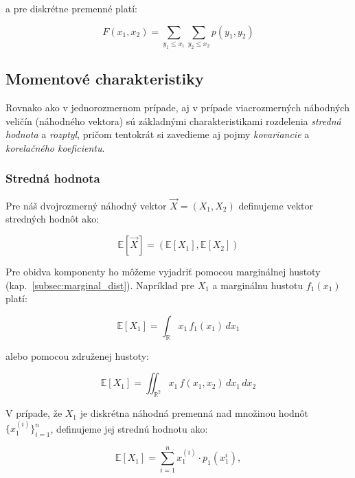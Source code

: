 a pre diskrétne premenné platí:

\begin{equation}
    F(x_1,x_2) = \sum_{y_1\leq x_1}\sum_{y_2\leq x_2} p(y_1,y_2)
\end{equation}

\subsection{Momentové charakteristiky}\label{joint_moments}

Rovnako ako v jednorozmernom prípade, aj v prípade viacrozmerných náhodných veličín (náhodného vektora) sú základnými charakteristikami rozdelenia \textit{stredná hodnota} a \textit{rozptyl}, pričom tentokrát si zavedieme aj pojmy \textit{kovariancie} a \textit{korelačného koeficientu}.

\subsubsection{Stredná hodnota}\label{subsubsec:joint_mean}

Pre náš dvojrozmerný náhodný vektor \(\vec{X} = (X_1, X_2)\) definujeme vektor stredných hodnôt ako:

\begin{equation}
\mathbb{E}[\vec{X}] = \left( \mathbb{E}[X_1], \mathbb{E}[X_2] \right)
\end{equation}

Pre obidva komponenty ho môžeme vyjadriť pomocou marginálnej hustoty (kap.~\ref{subsec:marginal_dist}). Napríklad pre \(X_1\) a marginálnu hustotu \(f_1(x_1)\) platí:

\begin{equation}
\mathbb{E}[X_1] = \int_{\mathbb{R}} x_1 \, f_1(x_1) \, dx_1
\end{equation}

alebo pomocou združenej hustoty:

\begin{equation}
\mathbb{E}[X_1] = \iint_{\mathbb{R}^2} x_1 \, f(x_1, x_2) \, dx_1 \, dx_2
\end{equation}

V prípade, že \(X_1\) je diskrétna náhodná premenná nad množinou hodnôt \(\{x_1^{(i)}\}_{i=1}^{n}\), definujeme jej strednú hodnotu ako:

\begin{equation}
\mathbb{E}[X_1] = \sum_{i=1}^{n} x_1^{(i)} \cdot p_1(x_1^{i}),
\end{equation}

